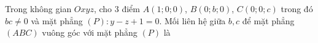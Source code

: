 \begin{ex}
Trong không gian $Oxyz$, cho $3$ điểm $A(1;0;0)$, $B(0;b;0)$, $C(0;0;c)$ trong đó $bc\ne0$ và mặt phẳng $(P)\colon y-z+1=0$. Mối liên hệ giữa $b,c$ để mặt phẳng $(ABC)$ vuông góc với mặt phẳng $(P)$ là
\end{ex}
